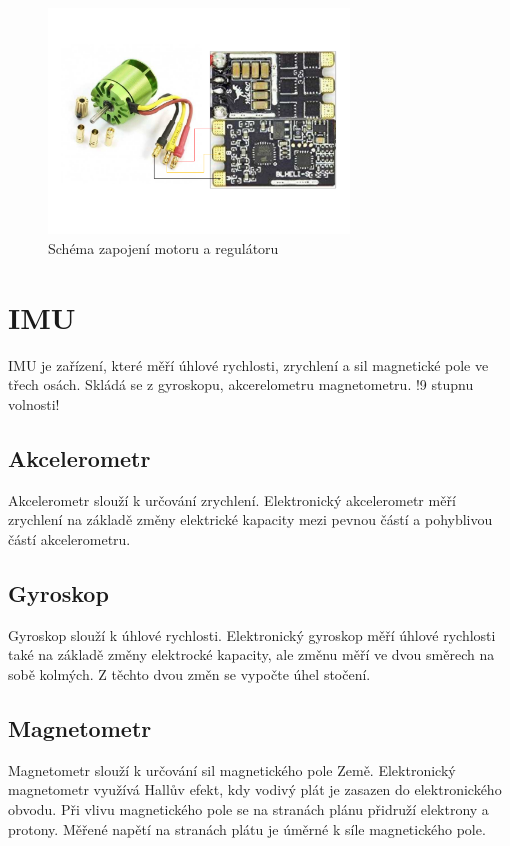 \begin{figure}[h]
	\centering
	\includegraphics[width=8cm]{pictures/motor.pdf}
	\caption{Schéma zapojení motoru a regulátoru}
\end{figure}

\section{IMU}
IMU je zařízení, které měří úhlové rychlosti, zrychlení a sil magnetické pole ve třech osách. Skládá se z gyroskopu, akcerelometru  magnetometru. !9 stupnu volnosti!

\subsection{Akcelerometr}
Akcelerometr slouží k určování zrychlení. Elektronický akcelerometr měří zrychlení na základě  změny elektrické kapacity mezi pevnou částí a pohyblivou částí akcelerometru. 

\subsection{Gyroskop}
Gyroskop slouží k úhlové rychlosti. Elektronický gyroskop měří úhlové rychlosti také na základě změny elektrocké kapacity, ale změnu měří ve dvou směrech na sobě kolmých. Z těchto dvou změn se vypočte úhel stočení.

\subsection{Magnetometr}
Magnetometr slouží k určování sil magnetického pole Země. Elektronický magnetometr využívá Hallův efekt, kdy vodivý plát je zasazen do elektronického obvodu. Při vlivu magnetického pole se na stranách plánu přidruží elektrony a protony. Měřené napětí na stranách plátu je úměrné k síle magnetického pole.


